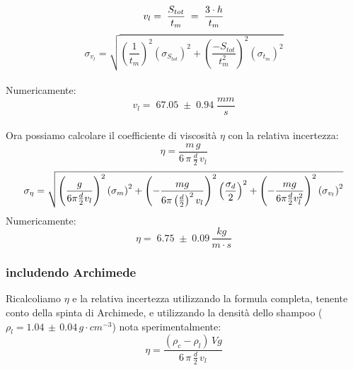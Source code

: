 \documentclass{article}
\begin{document}
\begin{equation}
        v_{l} = \;\frac{S_{tot}}{t_m}\; = \;\frac{3\cdot h}{t_m} \\[0.3cm]
\end{equation}
\begin{equation}
    \sigma_{v_l} = \sqrt{\left(\frac{1}{t_m}\right)^2\left(\sigma_{S_{tot}}\right)^2 + \left(\frac{-S_{tot}}{t_{m}^2}\right)^2 \left(\sigma_{t_m}\right)^2}
\end{equation}
\\[0.2cm]
\noindent Numericamente: 
\begin{equation*}
        v_{l} = \;67.05 \;\pm \;0.94\;\frac{mm}{s}
\end{equation*}
\\
Ora possiamo calcolare il coefficiente di viscosità $\eta$ con la relativa incertezza: 
\vspace{0.2cm}
\begin{equation}
    \eta = \frac{m\,g}{6\,\pi\,\frac{d}{2}\,v_l}
\end{equation}
\begin{equation}
     \sigma_{\eta} = \sqrt{\left(\frac{g}{6\pi \frac{d}{2} v_{l}}\right)^2 \left(\sigma_{m}\right)^2 + \left(-\frac{mg}{6\pi \left(\frac{d}{2}\right)^2 v_{l}}\right)^2 \left(\frac{\sigma_{d}}{2}\right)^2 + \left(-\frac{mg}{6\pi \frac{d}{2} v_{l}^2}\right)^2 \left(\sigma_{v_{l}}\right)^2} \\[0.4cm]
\end{equation}
\vspace{0.2cm}
\noindent Numericamente: 
\begin{equation*}
    \eta = \;6.75\; \pm\; 0.09 \,\frac{kg}{m\cdot s}
\end{equation*}
\vspace{0.3cm}

\subsubsection{\bm{$\eta$} includendo Archimede}
Ricalcoliamo $\eta$ e la relativa incertezza utilizzando la formula completa, tenente conto della spinta di Archimede, e utilizzando la densità dello shampoo ($\rho_l = 1.04\,\pm\,0.04\,g\cdot cm^{-3}$) nota sperimentalmente:
\vspace{0.2cm}
\begin{equation}
    \eta = \frac{(\rho_c - \rho_l)\,Vg}{6\,\pi\,\frac{d}{2}\,v_l}
\end{equation}
\end{document}
